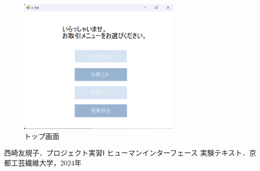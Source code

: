 \documentclass{jlreq}
\numberwithin{equation}{section}
\begin{document}
\begin{figure}[H]
  \centering
  \includegraphics[width=0.7\textwidth]{image/a_top.png}
  \caption{トップ画面}
  \label{fig:a_top}
\end{figure}

\begin{thebibliography}{9}
  \item 西崎友規子．プロジェクト実習Ⅰ ヒューマンインターフェース 実験テキスト．京都工芸繊維大学，2024年
\end{thebibliography}
\end{document}
